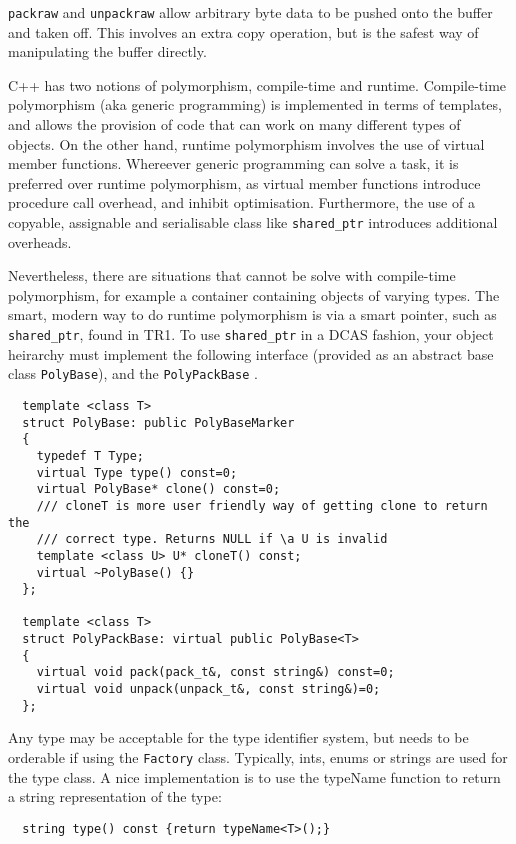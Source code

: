 \verb+packraw+ and \verb+unpackraw+ allow arbitrary byte data to be
pushed onto the buffer and taken off. This involves an extra copy
operation, but is the safest way of manipulating the buffer directly.

\label{polymorphism}

C++ has two notions of polymorphism, compile-time and runtime.
Compile-time polymorphism (aka generic programming) is implemented in
terms of templates, and allows the provision of code that can work on
many different types of objects. On the other hand, runtime
polymorphism involves the use of virtual member functions. Whereever generic programming can
solve a task, it is preferred over runtime polymorphism, as virtual
member functions introduce procedure call overhead, and inhibit
optimisation. Furthermore, the use of a copyable, assignable and
serialisable class like \verb+shared_ptr+ introduces additional overheads.

Nevertheless, there are situations that cannot be solve with
compile-time polymorphism, for example a container containing objects
of varying types. The smart, modern way to do runtime polymorphism is
via a smart pointer, such as \verb+shared_ptr+, found in TR1. To use
\verb+shared_ptr+ in a DCAS fashion, your object heirarchy must
implement the following interface (provided as an abstract base class
\verb+PolyBase+), and the \verb+PolyPackBase+ .

\begin{verbatim}
  template <class T>
  struct PolyBase: public PolyBaseMarker
  {
    typedef T Type;
    virtual Type type() const=0;
    virtual PolyBase* clone() const=0;
    /// cloneT is more user friendly way of getting clone to return the
    /// correct type. Returns NULL if \a U is invalid
    template <class U> U* cloneT() const;
    virtual ~PolyBase() {}
  };

  template <class T>
  struct PolyPackBase: virtual public PolyBase<T>
  {
    virtual void pack(pack_t&, const string&) const=0;
    virtual void unpack(unpack_t&, const string&)=0;
  };
\end{verbatim}

Any type may be acceptable for the type identifier system, but needs
to be orderable if using the \verb+Factory+
class. Typically, ints, enums or strings are used for
the type class. A nice implementation is to use the typeName function
to return a string representation of the type:
\begin{verbatim}
  string type() const {return typeName<T>();}
\end{verbatim}

